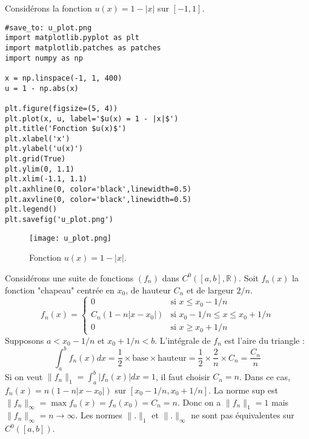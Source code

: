 \documentclass{article}
\theoremstyle{definition} %
\begin{document}
Considérons la fonction $u(x) = 1 - |x|$ sur $[-1, 1]$.
\begin{verbatim}
#save_to: u_plot.png
import matplotlib.pyplot as plt
import matplotlib.patches as patches
import numpy as np

x = np.linspace(-1, 1, 400)
u = 1 - np.abs(x)

plt.figure(figsize=(5, 4))
plt.plot(x, u, label='$u(x) = 1 - |x|$')
plt.title('Fonction $u(x)$')
plt.xlabel('x')
plt.ylabel('u(x)')
plt.grid(True)
plt.ylim(0, 1.1)
plt.xlim(-1.1, 1.1)
plt.axhline(0, color='black',linewidth=0.5)
plt.axvline(0, color='black',linewidth=0.5)
plt.legend()
plt.savefig('u_plot.png')
\end{verbatim}

\begin{figure}[H]
\centering
\texttt{[image: u\_plot.png]}
\caption{Fonction $u(x) = 1 - |x|$.}
\label{fig:u_plot}
\end{figure}

Considérons une suite de fonctions $(f_n)$ dans $C^0([a,b], \mathbb{R})$.
Soit $f_n(x)$ la fonction "chapeau" centrée en $x_0$, de hauteur $C_n$ et de largeur $2/n$.
\[ f_n(x) = \begin{cases} 0 & \text{si } x \le x_0 - 1/n \\ C_n (1 - n|x-x_0|) & \text{si } x_0 - 1/n \le x \le x_0 + 1/n \\ 0 & \text{si } x \ge x_0 + 1/n \end{cases} \]
Supposons $a < x_0 - 1/n$ et $x_0 + 1/n < b$.
L'intégrale de $f_n$ est l'aire du triangle :
\[ \int_a^b f_n(x) dx = \frac{1}{2} \times \text{base} \times \text{hauteur} = \frac{1}{2} \times \frac{2}{n} \times C_n = \frac{C_n}{n} \]
Si on veut $\|f_n\|_1 = \int_a^b |f_n(x)| dx = 1$, il faut choisir $C_n = n$.
Dans ce cas, $f_n(x) = n(1 - n|x-x_0|)$ sur $[x_0 - 1/n, x_0 + 1/n]$.
La norme sup est $\|f_n\|_\infty = \max f_n(x) = f_n(x_0) = C_n = n$.
Donc on a $\|f_n\|_1 = 1$ mais $\|f_n\|_\infty = n \to \infty$.
Les normes $\|.\|_1$ et $\|.\|_\infty$ ne sont pas équivalentes sur $C^0([a,b])$.
\end{document}
